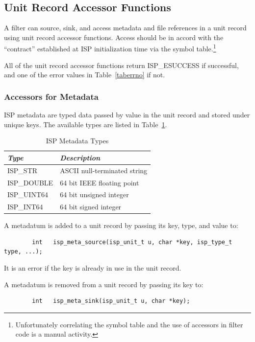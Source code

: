 \documentclass{article}
\begin{document}
\subsection{Unit Record Accessor Functions}\label{secaccessors}

A filter can source, sink, and access metadata and file references in
a unit record using unit record accessor functions.  Access should be in 
accord with the ``contract'' established at ISP initialization time via the
symbol table.\footnote{Unfortunately correlating the symbol table and
the use of accessors in filter code is a manual activity.}

All of the unit record accessor functions return ISP\_ESUCCESS if successful,
and one of the error values in Table~\ref{taberrno} if not.

\subsubsection{Accessors for Metadata}

ISP metadata are typed data passed by value in the unit record
and stored under unique keys.  The available types are listed in
Table~\ref{tabmetatypes}.

\begin{table}
\begin{center}
\begin{tabular}{|l|l|}\hline
{\em Type}	& {\em Description}\\
\hline
ISP\_STR 	& ASCII null-terminated string\\
ISP\_DOUBLE	& 64 bit IEEE floating point\\
ISP\_UINT64	& 64 bit unsigned integer\\
ISP\_INT64	& 64 bit signed integer\\
\hline
\end{tabular}
\end{center}
\caption{ISP Metadata Types}\label{tabmetatypes}
\end{table}

A metadatum is added to a unit record by passing its key, type, and value to:
\begin{verbatim}
        int   isp_meta_source(isp_unit_t u, char *key, isp_type_t type, ...);
\end{verbatim}
It is an error if the key is already in use in the unit record.

A metadatum is removed from a unit record by passing its key to:
\begin{verbatim}
        int   isp_meta_sink(isp_unit_t u, char *key);
\end{verbatim}
\end{document}
